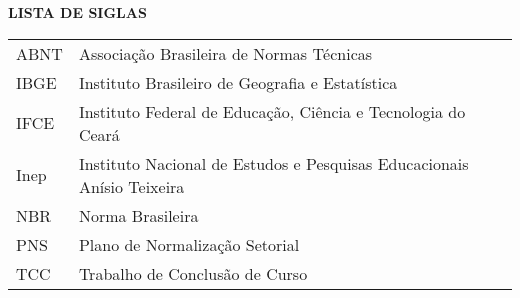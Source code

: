 \begin{center}
\textbf{LISTA DE SIGLAS}
\end{center}
\begin{tabular}{ll}
ABNT & Associação Brasileira de Normas Técnicas \\
IBGE & Instituto Brasileiro de Geografia e Estatística \\
IFCE & Instituto Federal de Educação, Ciência e Tecnologia do Ceará \\
Inep & Instituto Nacional de Estudos e Pesquisas Educacionais Anísio Teixeira \\
NBR & Norma Brasileira \\
PNS & Plano de Normalização Setorial \\
TCC & Trabalho de Conclusão de Curso \\
\end{tabular}
\addtocounter{table}{0}